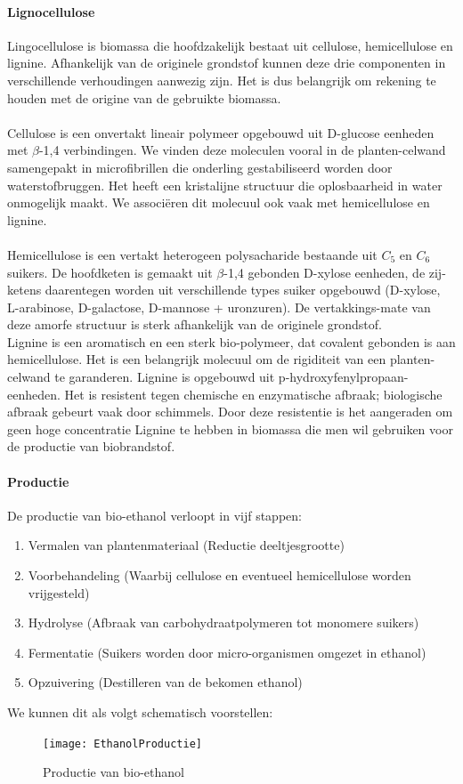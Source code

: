 \documentclass[a4paper,kul]{kulakarticle} %
\begin{document}
\paragraph{Lignocellulose}
Lingocellulose is biomassa die hoofdzakelijk bestaat uit cellulose, hemicellulose en lignine. Afhankelijk van de originele grondstof kunnen deze drie componenten in verschillende verhoudingen aanwezig zijn. Het is dus belangrijk om rekening te houden met de origine van de gebruikte biomassa.\\
\\
Cellulose is een onvertakt lineair polymeer opgebouwd uit D-glucose eenheden met $\beta$-1,4 verbindingen. We vinden deze moleculen vooral in de planten-celwand samengepakt in microfibrillen die onderling gestabiliseerd worden door waterstofbruggen. Het heeft een kristalijne structuur die oplosbaarheid in water onmogelijk maakt. We associëren dit molecuul ook vaak met hemicellulose en lignine.\\
\\
Hemicellulose is een vertakt heterogeen polysacharide bestaande uit $C_5$ en $C_6$ suikers. De hoofdketen is gemaakt uit $\beta$-1,4 gebonden D-xylose eenheden, de zij-ketens daarentegen worden uit verschillende types suiker opgebouwd (D-xylose, L-arabinose, D-galactose, D-mannose + uronzuren). De vertakkings-mate van deze amorfe structuur is sterk afhankelijk van de originele grondstof. 
\\
\newpage
\noindent
Lignine is een aromatisch en een sterk bio-polymeer, dat covalent gebonden is aan hemicellulose. Het is een belangrijk molecuul om de rigiditeit van een planten-celwand te garanderen. Lignine is opgebouwd uit p-hydroxyfenylpropaan-eenheden. Het is resistent tegen chemische en enzymatische afbraak; biologische afbraak gebeurt vaak door schimmels. Door deze resistentie is het aangeraden om geen hoge concentratie Lignine te hebben in biomassa die men wil gebruiken voor de productie van biobrandstof.
\paragraph{Productie}
De productie van bio-ethanol verloopt in vijf stappen:
\begin{enumerate}
	\item Vermalen van plantenmateriaal (Reductie deeltjesgrootte)
	\item Voorbehandeling (Waarbij cellulose en eventueel hemicellulose worden vrijgesteld)
	\item Hydrolyse (Afbraak van carbohydraatpolymeren tot monomere suikers)
	\item Fermentatie (Suikers worden door micro-organismen omgezet in ethanol)
	\item Opzuivering (Destilleren van de bekomen ethanol)
\end{enumerate}
We kunnen dit als volgt schematisch voorstellen:
\begin{figure}[h]
	\centering
	\texttt{[image: EthanolProductie]}
	\caption[Ethanol productie]{Productie van bio-ethanol}
	\label{fig:ethanolproductie}
\end{figure}
\end{document}
